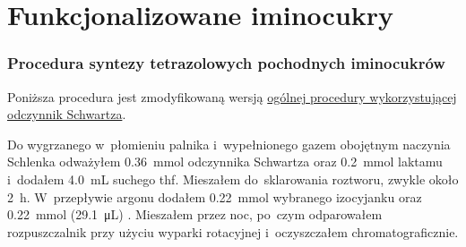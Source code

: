 \section{Funkcjonalizowane iminocukry}\label{experimental:iminosugars}
\subsubsection{Procedura syntezy tetrazolowych pochodnych iminocukrów}
Poniższa procedura jest zmodyfikowaną wersją \hyperref[experimental:activation:schwartz]{%
	ogólnej procedury wykorzystującej odczynnik Schwartza}.

Do wygrzanego w~płomieniu palnika i~wypełnionego gazem obojętnym naczynia Schlenka odważyłem
\SI{0.36}{\mmol} odczynnika Schwartza oraz \SI{0.2}{\mmol} laktamu i~dodałem \SI{4.0}{\mL} suchego \gls{thf}.
Mieszałem do~sklarowania roztworu, zwykle około \SI{2}{\hour}.
W~przepływie argonu dodałem \SI{0.22}{\mmol} wybranego izocyjanku oraz \SI{0.22}{\mmol} (\SI{29.1}{\micro\liter}) .
Mieszałem przez noc, po~czym odparowałem rozpuszczalnik przy użyciu wyparki rotacyjnej
	i~oczyszczałem chromatograficznie.

